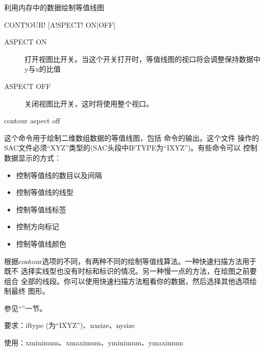 \label{cmd:contour}

利用内存中的数据绘制等值线图

\begin{SACSTX}
CONT!OUR! [A!SPECT! ON|OFF]
\end{SACSTX}

\begin{description}
\item [ASPECT ON] 打开视图比开关。当这个开关打开时，等值线图的视口将会调整保持数据中y与x的比值
\item [ASPECT OFF] 关闭视图比开关，这时将使用整个视口。
\end{description}

\begin{SACDFT}
contour  aspect  off
\end{SACDFT}

这个命令用于绘制二维数组数据的等值线图，包括 
命令的输出。这个文件
操作的SAC文件必须``XYZ''类型的(SAC头段中IFTYPE为``IXYZ'')。有些命令可以
控制数据显示的方式：
\begin{itemize}
\item {} 控制等值线的数目以及间隔
\item {} 控制等值线的线型
\item {} 控制等值线标签
\item {} 控制方向标记
\item {} 控制等值线颜色
\end{itemize}

根据contour选项的不同，有两种不同的绘制等值线算法。一种快速扫描方法用于既不
选择实线型也没有时标和标识的情况。另一种慢一点的方法，在绘图之前要组合
全部的线段。你可以使用快速扫描方法粗看你的数据，然后选择其他选项绘制最终
图形。

参见``''一节。

要求：iftype (为``IXYZ'')、nxsize、nysize

使用：xminimum、xmaximum、yminimum、ymaximum
